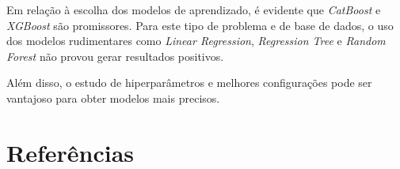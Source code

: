 \documentclass{article}
\begin{document}
Em relação à escolha dos modelos de aprendizado, é evidente que \textit{CatBoost} e \textit{XGBoost} são promissores. Para este tipo de problema e de base de dados, o uso dos modelos rudimentares como \textit{Linear Regression}, \textit{Regression Tree} e \textit{Random Forest} não provou gerar resultados positivos.

Além disso, o estudo de hiperparâmetros e melhores configurações pode ser vantajoso para obter modelos mais precisos. 

\newpage
\section{Referências}
\end{document}
